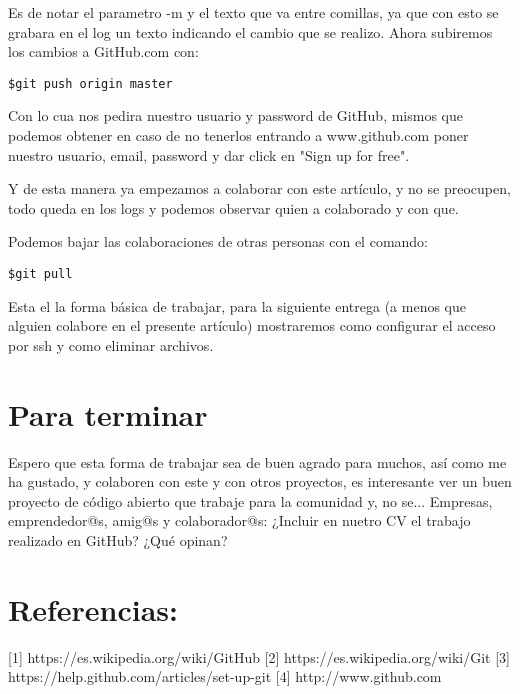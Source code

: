 \documentclass[	DIV=calc,%
							paper=letterpaper,%
							fontsize=13pt,%
							twocolumn]
{article}	 					%
\begin{document}
Es de notar el parametro -m y el texto que va entre comillas, ya que con esto se grabara en el log un texto indicando el cambio que se realizo. Ahora subiremos los cambios a GitHub.com con:

\begin{verbatim}
$git push origin master
\end{verbatim}

Con lo cua nos pedira nuestro usuario y password de GitHub, mismos que podemos obtener en caso de no tenerlos entrando a www.github.com poner nuestro usuario, email, password y dar click en "Sign up for free".

Y de esta manera ya empezamos a colaborar con este artículo, y no se preocupen, todo queda en los logs y podemos observar quien a colaborado y con que.

Podemos bajar las colaboraciones de otras personas con el comando:

\begin{verbatim}
$git pull
\end{verbatim}

Esta el la forma básica de trabajar, para la siguiente entrega (a menos que alguien colabore en el presente artículo) mostraremos como configurar el acceso por ssh y como eliminar archivos.

\section*{Para terminar}
Espero que esta forma de trabajar sea de buen agrado para muchos, así como me ha gustado, y colaboren con este y con otros proyectos, es interesante ver un buen proyecto de código abierto que trabaje para la comunidad y, no se... Empresas, emprendedor@s, amig@s y colaborador@s: ¿Incluir en nuetro CV el trabajo realizado en GitHub? ¿Qué opinan?

\section*{Referencias:}
[1] https://es.wikipedia.org/wiki/GitHub
[2] https://es.wikipedia.org/wiki/Git
[3] https://help.github.com/articles/set-up-git
[4] http://www.github.com
\end{document}
